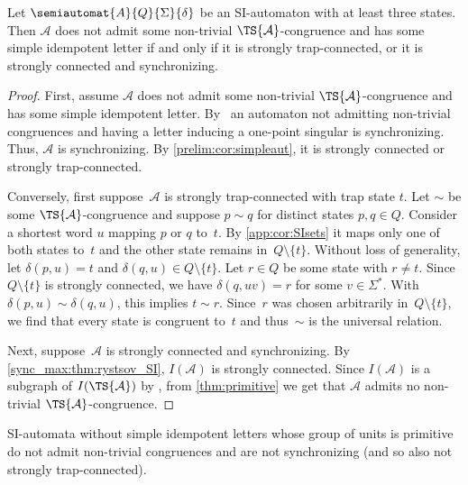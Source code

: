 \begin{proposition}  \label{sync_max:prop:sufficient-primitive-SI}
	Let $\semiautomat{A}{Q}{\Sigma}{\delta}$ be an SI-automaton with at least three states.
	Then $\mathcal A$ does not admit some non-trivial $\TS{\mathcal A}$-congruence and has some simple idempotent letter
	if and only if it is strongly trap-connected, or it is
	strongly connected and synchronizing.
\end{proposition}
\begin{proof}
	First, assume $\mathcal A$ does not admit some non-trivial $\TS{\mathcal A}$-congruence and 
	has some simple idempotent letter.
	By~\cite[Cor.~2.3]{Volkov24} an automaton not admitting non-trivial congruences
	and having a letter inducing a one-point singular is synchronizing.
	Thus, $\mathcal A$ is synchronizing.
	By \cref{prelim:cor:simpleaut}, 
	it is strongly connected or strongly trap-connected.	
	
	Conversely, first suppose~$\mathcal A$ is strongly trap-connected with trap state $t$.
Let $\sim$ be some $\TS{\mathcal A}$-congruence
and suppose $p \sim q$ for distinct states $p,q \in Q$.
Consider a shortest word $u$
mapping $p$ or $q$ to~$t$.
By \cref{app:cor:SIsets} it
maps only one of both states to~$t$
and the other state remains in~$Q \setminus \{t\}$.
Without loss of generality,
let $\delta(p, u) = t$
and $\delta(q, u) \in Q \setminus \{t\}$.
Let $r \in Q$ be some state with $r \ne t$.
Since~$Q \setminus \{t\}$ is strongly connected,
we have $\delta(q, uv) = r$
for some $v \in \Sigma^*$.
With $\delta(p, u) \sim \delta(q, u)$, this implies $t \sim r$.
Since~$r$ was chosen arbitrarily in~$Q \setminus \{t\}$,
we find that every state is congruent to~$t$
and thus~$\sim$ is the universal relation.

Next, suppose~$\mathcal A$
is strongly connected and synchronizing.
By \cref{sync_max:thm:rystsov_SI}, $I(\mathcal A)$
is strongly connected. Since $I(\mathcal A)$ is a subgraph of $I(\TS{\mathcal A})$
by ,
from \cref{thm:primitive} we get that $\mathcal A$
admits no non-trivial $\TS{\mathcal A}$-congruence. 
\end{proof}


	SI-automata without simple idempotent letters
	whose group of units is primitive do not admit non-trivial congruences
	and are not synchronizing (and so also not strongly trap-connected).
	
